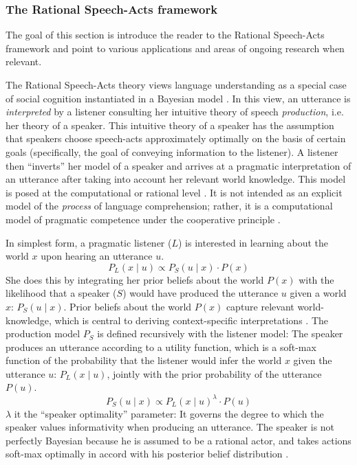 \documentclass[12pt,letterpaper]{article}
\begin{document}
\subsubsection*{The Rational Speech-Acts framework}

The goal of this section is introduce the reader to the Rational Speech-Acts framework and point to various applications and areas of ongoing research when relevant.

The Rational Speech-Acts theory views language understanding as a special case of social cognition instantiated in a Bayesian model \cite{Goodman2013}. 
In this view, an utterance is \emph{interpreted} by a listener consulting her intuitive theory of speech \emph{production}, i.e. her theory of a speaker. This intuitive theory of a speaker has the assumption that speakers choose speech-acts approximately optimally on the basis of certain goals (specifically, the goal of conveying information to the listener). 
A listener then ``inverts'' her model of a speaker and arrives at a pragmatic interpretation of an utterance after taking into account her relevant world knowledge. 
This model is posed at the computational or rational level \cite{Marr1980, Anderson1991}. 
It is not intended as an explicit model of the \emph{process} of language comprehension; rather, it is a computational model of pragmatic competence under the cooperative principle \cite{Grice1975}. 

In simplest form, a pragmatic listener ($L$) is interested in learning about the world $x$ upon hearing an utterance $u$. 
$$
P_{L}(x  \mid u) \propto P_{S}(u \mid x) \cdot P(x) \label{eq:RSA_L}
$$
She does this by integrating her prior beliefs about the world $P(x)$ with the likelihood that a speaker ($S$) would have produced the utterance $u$ given a world $x$: $P_{S}(u \mid x)$.
Prior beliefs about the world $P(x)$ capture relevant world-knowledge, which is central to deriving context-specific interpretations \cite{Degen2015cogsci}.
The production model $P_{S}$ is defined recursively with the listener model: The speaker produces an utterance according to a utility function, which is a soft-max function of the probability that the listener would infer the world $x$ given the utterance $u$: $P_{L}(x  \mid u)$, jointly with the prior probability of the utterance $P(u)$.
$$
P_{S}(u \mid x) \propto P_{L}(x  \mid u) ^\lambda \cdot P(u) \label{eq:RSA_S}
$$
$\lambda$ it the ``speaker optimality'' parameter: It governs the degree to which the speaker values informativity when producing an utterance. The speaker is not perfectly Bayesian because he is assumed to be a rational actor, and takes actions soft-max optimally in accord with his posterior belief distribution \cite{Baker2009}.
\end{document}

